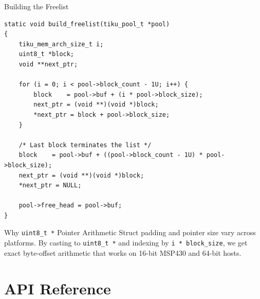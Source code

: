 \documentclass[aspectratio=169, 10pt]{beamer}
\begin{document}
\begin{frame}[fragile]{Building the Freelist}
\begin{lstlisting}[style=cstyle, title={kernel/memory/tiku\_pool.c (private helper)}]
static void build_freelist(tiku_pool_t *pool)
{
    tiku_mem_arch_size_t i;
    uint8_t *block;
    void **next_ptr;

    for (i = 0; i < pool->block_count - 1U; i++) {
        block    = pool->buf + (i * pool->block_size);
        next_ptr = (void **)(void *)block;
        *next_ptr = block + pool->block_size;
    }

    /* Last block terminates the list */
    block    = pool->buf + ((pool->block_count - 1U) * pool->block_size);
    next_ptr = (void **)(void *)block;
    *next_ptr = NULL;

    pool->free_head = pool->buf;
}
\end{lstlisting}

\begin{block}{Why \texttt{uint8\_t *} Pointer Arithmetic}
Struct padding and pointer size vary across platforms. By casting
to \texttt{uint8\_t *} and indexing by \texttt{i * block\_size}, we get exact
byte-offset arithmetic that works on 16-bit MSP430 and 64-bit hosts.
\end{block}
\end{frame}

\section{API Reference}
\end{document}
